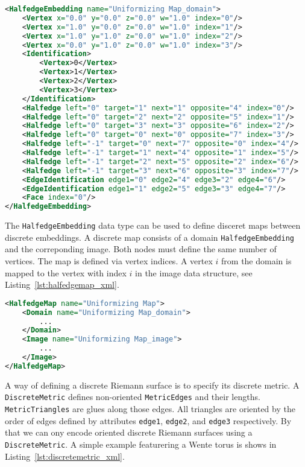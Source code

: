 \documentclass[Thesis.tex]{subfiles}
\begin{document}
\begin{lstlisting}[label=lst:halfedge_xml, caption={A torus given as {\tt HalfedegeEmbedding}
with identified edge pairs and vertices.}, numbers=none, language=XML, captionpos=b]
<HalfedgeEmbedding name="Uniformizing Map_domain">
	<Vertex x="0.0" y="0.0" z="0.0" w="1.0" index="0"/>
	<Vertex x="1.0" y="0.0" z="0.0" w="1.0" index="1"/>
	<Vertex x="1.0" y="1.0" z="0.0" w="1.0" index="2"/>
	<Vertex x="0.0" y="1.0" z="0.0" w="1.0" index="3"/>
	<Identification>
		<Vertex>0</Vertex>
		<Vertex>1</Vertex>
		<Vertex>2</Vertex>
		<Vertex>3</Vertex>
	</Identification>
	<Halfedge left="0" target="1" next="1" opposite="4" index="0"/>
	<Halfedge left="0" target="2" next="2" opposite="5" index="1"/>
	<Halfedge left="0" target="3" next="3" opposite="6" index="2"/>
	<Halfedge left="0" target="0" next="0" opposite="7" index="3"/>
	<Halfedge left="-1" target="0" next="7" opposite="0" index="4"/>
	<Halfedge left="-1" target="1" next="4" opposite="1" index="5"/>
	<Halfedge left="-1" target="2" next="5" opposite="2" index="6"/>
	<Halfedge left="-1" target="3" next="6" opposite="3" index="7"/>
	<EdgeIdentification edge1="0" edge2="4" edge3="2" edge4="6"/>
	<EdgeIdentification edge1="1" edge2="5" edge3="3" edge4="7"/>
	<Face index="0"/>
</HalfedgeEmbedding>
\end{lstlisting}

The {\tt HalfedgeEmbedding} data type can be used to define disceret maps between discrete embeddings. A discrete map consists of
a domain {\tt HalfedgeEmbedding} and the correponding image. Both nodes must define the same number of vertices. The map is defined
via vertex indices. A vertex $i$ from the domain is mapped to the vertex with index $i$ in the image data structure, see Listing~\ref{lst:halfedgemap_xml}.

\begin{lstlisting}[label=lst:halfedgemap_xml, caption={A discrete map is given by a pair of {\tt HalfedgeEmbedding}s, the {\tt Domain} and {\tt Image} of the map. Both are of type {\tt HalfedgeEmbedding}.}, numbers=none, language=XML, captionpos=b]
<HalfedgeMap name="Uniformizing Map">
	<Domain name="Uniformizing Map_domain">
		...
	</Domain>
	<Image name="Uniformizing Map_image">
		...
	</Image>
</HalfedgeMap>
\end{lstlisting}

A way of defining a discrete Riemann surface is to specify its discrete metric. A {\tt DiscreteMetric} defines non-oriented {\tt MetricEdges}
and their lengths. {\tt MetricTriangles} are glues along those edges. All triangles are oriented by the order of edges defined by attributes
{\tt edge1}, {\tt edge2}, and {\tt edge3} respectively. By that we can ony encode oriented discrete Riemann surfaces using a {\tt DiscreteMetric}.
A simple example featurering a Wente torus is shows in Listing~\ref{lst:discretemetric_xml}.
\end{document}
